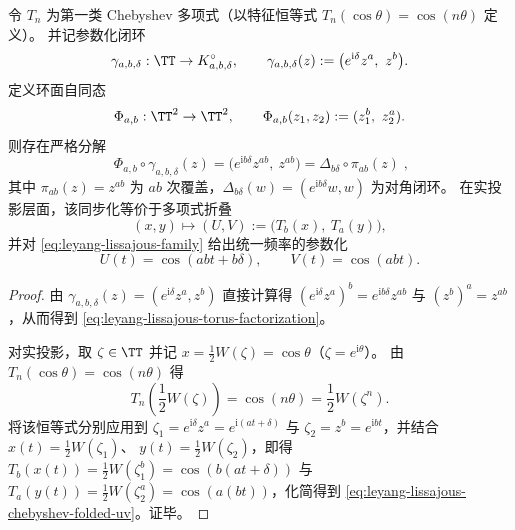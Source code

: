 \begin{proposition}\label{prop:leyang-lissajous-torus-endomorphism-chebyshev}
令 \(T_n\) 为第一类 Chebyshev 多项式（以特征恒等式 \(T_n(\cos\theta)=\cos(n\theta)\) 定义）。
并记参数化闭环
\[
\gamma_{a,b,\delta}:\TT\to K_{a,b,\delta}^{\circ},\qquad
\gamma_{a,b,\delta}(z):=\bigl(e^{\mathrm{i}\delta}z^a,\ z^b\bigr).
\]
定义环面自同态
\[
\Phi_{a,b}:\TT^2\to\TT^2,\qquad \Phi_{a,b}(z_1,z_2):=(z_1^b,\ z_2^a).
\]
则存在严格分解
\begin{equation}\label{eq:leyang-lissajous-torus-factorization}
\boxed{\;
\Phi_{a,b}\circ \gamma_{a,b,\delta}(z)
=\bigl(e^{\mathrm{i}b\delta}z^{ab},\ z^{ab}\bigr)
=\Delta_{b\delta}\circ \pi_{ab}(z)\; } ,
\end{equation}
其中 \(\pi_{ab}(z)=z^{ab}\) 为 \(ab\) 次覆盖，\(\Delta_{b\delta}(w)=(e^{\mathrm{i}b\delta}w,w)\) 为对角闭环。
在实投影层面，该同步化等价于多项式折叠
\[
(x,y)\longmapsto (U,V):=\bigl(T_b(x),\ T_a(y)\bigr),
\]
并对 \eqref{eq:leyang-lissajous-family} 给出统一频率的参数化
\begin{equation}\label{eq:leyang-lissajous-chebyshev-folded-uv}
\boxed{\;
U(t)=\cos(abt+b\delta),\qquad V(t)=\cos(abt).\;}
\end{equation}
\end{proposition}
\begin{proof}
由 \(\gamma_{a,b,\delta}(z)=(e^{\mathrm{i}\delta}z^a,z^b)\) 直接计算得
\(
(e^{\mathrm{i}\delta}z^a)^b=e^{\mathrm{i}b\delta}z^{ab}
\)
与
\(
(z^b)^a=z^{ab}
\)，从而得到 \eqref{eq:leyang-lissajous-torus-factorization}。
\par
对实投影，取 \(\zeta\in\TT\) 并记 \(x=\frac12W(\zeta)=\cos\theta\)（\(\zeta=e^{\mathrm{i}\theta}\)）。
由 \(T_n(\cos\theta)=\cos(n\theta)\) 得
\[
T_n\!\left(\frac12W(\zeta)\right)=\cos(n\theta)=\frac12W(\zeta^n).
\]
将该恒等式分别应用到 \(\zeta_1=e^{\mathrm{i}\delta}z^a=e^{\mathrm{i}(at+\delta)}\) 与 \(\zeta_2=z^b=e^{\mathrm{i}bt}\)，并结合
\(
x(t)=\frac12W(\zeta_1)
\)、
\(
y(t)=\frac12W(\zeta_2)
\)，即得
\(
T_b(x(t))=\frac12W(\zeta_1^b)=\cos(b(at+\delta))
\)
与
\(
T_a(y(t))=\frac12W(\zeta_2^a)=\cos(a(bt))
\)，化简得到 \eqref{eq:leyang-lissajous-chebyshev-folded-uv}。证毕。
\end{proof}

